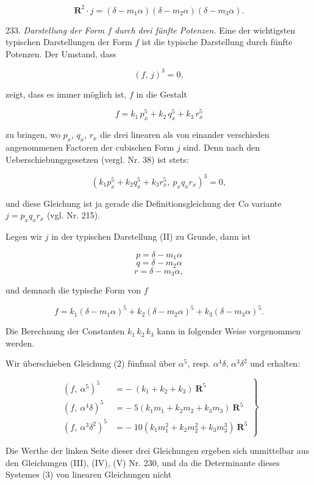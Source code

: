 \documentclass[11pt]{article}
\providecommand{\weq}[2]{\begin{equation}\tag{#1}#2\end{equation}}
\begin{document}
\weq{II}{
\mathbf{R}^2\cdot j = (\delta - m_1\alpha)(\delta - m_2\alpha)(\delta - m_3\alpha).
}

233. \textit{Darstellung der Form $f$ durch drei fünfte Potenzen.} Eine
der wichtigsten typischen Darstellungen der Form $f$ ist die typische
Darstellung durch fünfte Potenzen. Der Umstand, dass

\weq{1}{
(f,\,j)^3 = 0,
}

zeigt, dass es immer möglich ist, $f$ in die Gestalt

\[
f = k_1\,p_x^5 + k_2\,q_x^5 + k_3\,r_x^5
\]

zu bringen, wo $p_x$, $q_x$, $r_x$ die drei linearen als von einander
verschieden angenommenen Factoren der cubischen Form $j$ sind. Denn
nach den Ueberschiebungsgesetzen (vergl. Nr. 38) ist stets:

\[
(k_1p_x^5 + k_2q_x^5 + k_3r_x^5,\ p_xq_xr_x)^3 = 0,
\]

und diese Gleichung ist ja gerade die Definitionsgleichung der Co\-
variante $j = p_xq_xr_x$ (vgl. Nr. 215).

Legen wir $j$ in der typischen Darstellung (II) zu Grunde, dann ist

\[
p = \delta - m_1\alpha
\]
\[
q = \delta - m_2\alpha
\]
\[
r = \delta - m_3\alpha,
\]

und demnach die typische Form von $f$

\weq{2}{
f = k_1(\delta - m_1\alpha)^5 + k_2(\delta - m_2\alpha)^5 + k_3(\delta - m_3\alpha)^5.
}

Die Berechnung der Constanten $k_1\,k_2\,k_3$ kann in folgender Weise
vorgenommen werden.

Wir überschieben Gleichung (2) fünfmal über $\alpha^5$, resp. $\alpha^4\delta$,
$\alpha^3\delta^2$ und erhalten:

\weq{3}{
\left.
\begin{aligned}
(f,\ \alpha^5)^5 &= -\ (k_1 + k_2 + k_3)\ \mathbf{R}^5\\
(f,\ \alpha^4\delta)^5 &= -\ 5(k_1m_1 + k_2m_2 + k_3m_3)\ \mathbf{R}^5\\
(f,\ \alpha^3\delta^2)^5 &= -\ 10(k_1m_1^2 + k_2m_2^2 + k_3m_3^3)\ \mathbf{R}^5
\end{aligned}
\right\}
}

Die Werthe der linken Seite dieser drei Gleichungen ergeben sich
unmittelbar aus den Gleichungen (III), (IV), (V) Nr. 230, und da die
Determinante dieses Systemes (3) von linearen Gleichungen nicht
\end{document}
